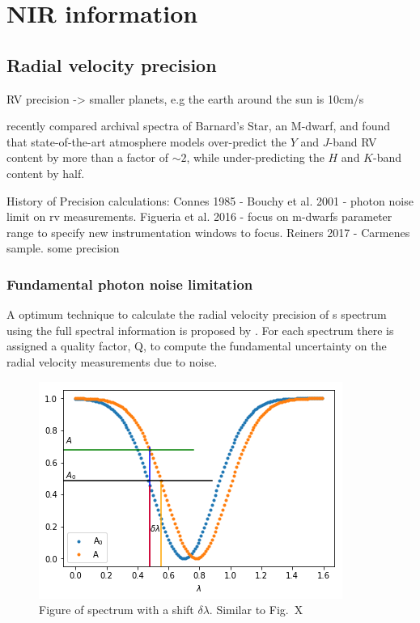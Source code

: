 
\chapter{NIR information}  %

\label{cha:nir_content}


\section{Radial velocity precision}
RV precision -> smaller planets, e.g the earth around the sun is 10cm/s

\citet{artigau_optical_2018} recently compared archival spectra of Barnard's Star, an M-dwarf, and found that state-of-the-art atmosphere models over-predict the $Y$ and $J$-band RV content by more than a factor of $\sim$$2$, while under-predicting the $H$ and $K$-band content by half.
 

History of Precision calculations:
Connes 1985 -
Bouchy et al. 2001  - photon noise limit on rv measurements.   
Figueria et al. 2016 - focus on m-dwarfs parameter range to specify new instrumentation windows to focus.
Reiners 2017 -  Carmenes sample. some precision



\subsection{Fundamental photon noise limitation}
A optimum technique to calculate the radial velocity precision of s spectrum using the full spectral information is proposed by \citet{Connes1985}. For each spectrum there is assigned a quality factor, Q, to compute the fundamental uncertainty on the radial velocity measurements due to noise.

\begin{figure}
    \centering
    \includegraphics[width=0.7\linewidth]{figures/precision_derivation}

    \caption{Figure of spectrum with a shift $\delta \lambda$. Similar to \citet{Connes1985} Fig.~X  }
    \label{fig:precisionderivation}
\end{figure}

